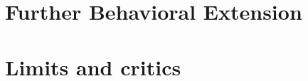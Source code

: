\documentclass{beamer}
\begin{document}
\section{Further Behavioral Extension}
\begin{frame}
\end{frame}

\section{Limits and critics}
\begin{frame}
\end{frame}
\end{document}

